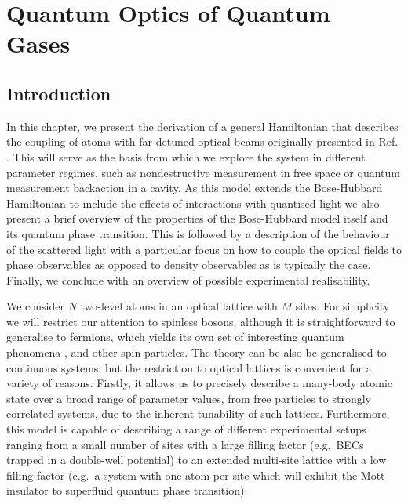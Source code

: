 
\chapter{Quantum Optics of Quantum Gases}  

\ifpdf
    \graphicspath{{Chapter2/Figs/Raster/}{Chapter2/Figs/PDF/}{Chapter2/Figs/}}
\else
    \graphicspath{{Chapter2/Figs/Vector/}{Chapter2/Figs/}}
\fi    

\section{Introduction}

In this chapter, we present the derivation of a general Hamiltonian
that describes the coupling of atoms with far-detuned optical beams
originally presented in Ref. \cite{mekhov2012}. This will serve as the
basis from which we explore the system in different parameter regimes,
such as nondestructive measurement in free space or quantum
measurement backaction in a cavity. As this model extends the
Bose-Hubbard Hamiltonian to include the effects of interactions with
quantised light we also present a brief overview of the properties of
the Bose-Hubbard model itself and its quantum phase transition. This is
followed by a description of the behaviour of the scattered light with
a particular focus on how to couple the optical fields to phase
observables as opposed to density observables as is typically the
case. Finally, we conclude with an overview of possible experimental
realisability.

We consider $N$ two-level atoms in an optical lattice with $M$
sites. For simplicity we will restrict our attention to spinless
bosons, although it is straightforward to generalise to fermions,
which yields its own set of interesting quantum phenomena
\cite{atoms2015, mazzucchi2016, mazzucchi2016af}, and other spin
particles. The theory can be also be generalised to continuous
systems, but the restriction to optical lattices is convenient for a
variety of reasons. Firstly, it allows us to precisely describe a
many-body atomic state over a broad range of parameter values, from
free particles to strongly correlated systems, due to the inherent
tunability of such lattices. Furthermore, this model is capable of
describing a range of different experimental setups ranging from a
small number of sites with a large filling factor (e.g.~BECs trapped
in a double-well potential) to an extended multi-site lattice with a
low filling factor (e.g.~a system with one atom per site which will
exhibit the Mott insulator to superfluid quantum phase transition).

